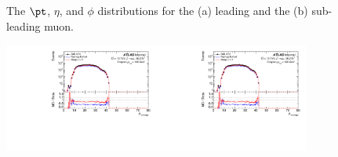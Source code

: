 \begin{figure}[h!]
  \caption{The $\pt$, $\eta$, and $\phi$ distributions for the (a) leading and the (b) sub-leading muon.}
  \label{fig:pTetamus}
\end{figure}

\begin{figure}[h!]
  \centering
  \includegraphics[page=72,width=0.45\textwidth]{figures/ZjetOmnifoldMCDataComp.pdf}\includegraphics[page=76,width=0.45\textwidth]{figures/ZjetOmnifoldMCDataComp.pdf} \\
   \\

\end{figure}
